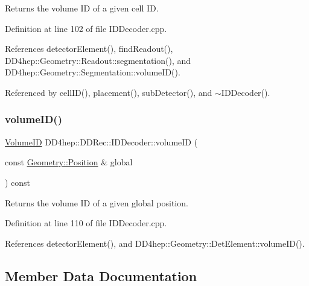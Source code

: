 Returns the volume ID of a given cell ID. 



Definition at line 102 of file I\+D\+Decoder.\+cpp.



References detector\+Element(), find\+Readout(), D\+D4hep\+::\+Geometry\+::\+Readout\+::segmentation(), and D\+D4hep\+::\+Geometry\+::\+Segmentation\+::volume\+I\+D().



Referenced by cell\+I\+D(), placement(), sub\+Detector(), and $\sim$\+I\+D\+Decoder().

\hypertarget{class_d_d4hep_1_1_d_d_rec_1_1_i_d_decoder_aaf4840710b3a94beecfb2208baf3938d}{}\label{class_d_d4hep_1_1_d_d_rec_1_1_i_d_decoder_aaf4840710b3a94beecfb2208baf3938d} 
\subsubsection{\texorpdfstring{volume\+I\+D()}{volumeID()}\hspace{0.1cm}{\footnotesize\ttfamily [2/2]}}
{\footnotesize\ttfamily \hyperlink{namespace_d_d4hep_1_1_d_d_rec_a5b5fea15b3678944e1aba487a746bdcb}{Volume\+ID} D\+D4hep\+::\+D\+D\+Rec\+::\+I\+D\+Decoder\+::volume\+ID (\begin{DoxyParamCaption}\item[{const \hyperlink{namespace_d_d4hep_1_1_geometry_a55083902099d03506c6db01b80404900}{Geometry\+::\+Position} \&}]{global }\end{DoxyParamCaption}) const}



Returns the volume ID of a given global position. 



Definition at line 110 of file I\+D\+Decoder.\+cpp.



References detector\+Element(), and D\+D4hep\+::\+Geometry\+::\+Det\+Element\+::volume\+I\+D().



\subsection{Member Data Documentation}
\hypertarget{class_d_d4hep_1_1_d_d_rec_1_1_i_d_decoder_ac50ec26200a394bf0d75f44898910815}{}\label{class_d_d4hep_1_1_d_d_rec_1_1_i_d_decoder_ac50ec26200a394bf0d75f44898910815} 
